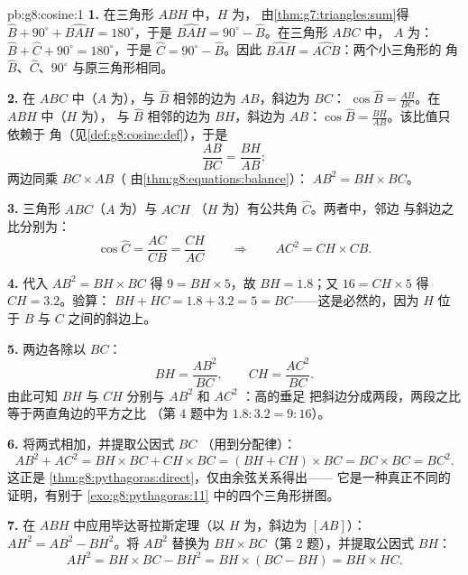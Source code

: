 \begin{solution}{pb:g8:cosine:1}
\textbf{1.} 在三角形 $ABH$ 中，$H$ 为，
由\cref{thm:g7:triangles:sum}得
$\widehat B + 90^\circ + \widehat{BAH} = 180^\circ$，于是
$\widehat{BAH} = 90^\circ - \widehat B$。在三角形 $ABC$ 中，
$A$ 为：
$\widehat B + \widehat C + 90^\circ = 180^\circ$，于是
$\widehat C = 90^\circ - \widehat B$。因此
$\widehat{BAH} = \widehat{ACB}$：两个小三角形的
角 $\widehat B$、$\widehat C$、$90^\circ$ 与原三角形相同。

\textbf{2.} 在 $ABC$ 中（$A$ 为），与 $\widehat B$ 相邻的边为
$AB$，斜边为 $BC$：
$\cos\widehat B = \frac{AB}{BC}$。在 $ABH$ 中（$H$ 为），
与 $\widehat B$ 相邻的边为 $BH$，斜边为
$AB$：$\cos\widehat B = \frac{BH}{AB}$。该比值只依赖于
角（见\cref{def:g8:cosine:def}），于是
\[
\frac{AB}{BC} = \frac{BH}{AB} ;
\]
两边同乘 $BC \times AB$（
由\cref{thm:g8:equations:balance}）：
$AB^2 = BH \times BC$。

\textbf{3.} 三角形 $ABC$（$A$ 为）与 $ACH$
（$H$ 为）有公共角 $\widehat C$。两者中，邻边
与斜边之比分别为：
\[
\cos\widehat C = \frac{AC}{CB} = \frac{CH}{AC}
\qquad\Longrightarrow\qquad
AC^2 = CH \times CB .
\]

\textbf{4.} 代入 $AB^2 = BH \times BC$ 得 $9 = BH \times 5$，故
$BH = 1.8$；又 $16 = CH \times 5$ 得 $CH = 3.2$。验算：
$BH + HC = 1.8 + 3.2 = 5 = BC$——这是必然的，因为 $H$
位于 $B$ 与 $C$ 之间的斜边上。

\textbf{5.} 两边各除以 $BC$：
\[
BH = \frac{AB^2}{BC},
\qquad
CH = \frac{AC^2}{BC} .
\]
由此可知 $BH$ 与 $CH$ 分别与 $AB^2$ 和 $AC^2$ ：高的垂足
把斜边分成两段，两段之比等于两直角边的平方之比
（第 4 题中为 $1.8 : 3.2 = 9 : 16$）。

\textbf{6.} 将两式相加，并提取公因式 $BC$
（用到分配律）：
\[
AB^2 + AC^2 = BH \times BC + CH \times BC
= (BH + CH) \times BC = BC \times BC = BC^2 .
\]
这正是 \cref{thm:g8:pythagoras:direct}，仅由余弦关系得出——
它是一种真正不同的证明，有别于
\cref{exo:g8:pythagoras:11} 中的四个三角形拼图。

\textbf{7.} 在 $ABH$ 中应用毕达哥拉斯定理（以 $H$ 为，斜边为
$[AB]$）：$AH^2 = AB^2 - BH^2$。将 $AB^2$ 替换为
$BH \times BC$（第 2 题），并提取公因式 $BH$：
\[
AH^2 = BH \times BC - BH^2
= BH \times (BC - BH)
= BH \times HC .
\]


\end{solution}
